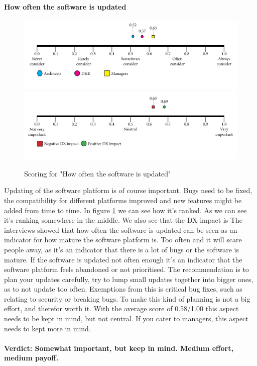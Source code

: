 \documentclass{article}
\begin{document}
\paragraph{How often the software is updated}
\begin{figure}[H]
\centering
\includegraphics[width=\linewidth]{scorelines/aspect1.png}
\includegraphics[width=\linewidth]{dxscorelines/dxaspect1.png}
\caption{Scoring for "How often the software is updated"}
\label{fig:aspect1}
\end{figure}
Updating of the software platform is of course important. Bugs need to be fixed, the compatibility for different platforms improved and new features might be added from time to time. In figure \ref{fig:aspect1} we can see how it's ranked. As we can see it's ranking somewhere in the middle. We also see that the DX impact is  The interviews showed that how often the software is updated can be seen as an indicator for how mature the software platform is. Too often and it will scare people away, as it's an indicator that there is a lot of bugs or the software is mature. If the software is updated not often enough it's an indicator that the software platform feels abandoned or not prioritised. The recommendation is to plan your updates carefully, try to lump small updates together into bigger ones, as to not update too often. Exemptions from this is critical bug fixes, such as relating to security or breaking bugs. To make this kind of planning is not a big effort, and therefor worth it. With the average score of 0.58/1.00 this aspect needs to be kept in mind, but not central. If you cater to managers, this aspect needs to kept more in mind. \\ \\
\textbf{Verdict: Somewhat important, but keep in mind. Medium effort, medium payoff.}
\end{document}
